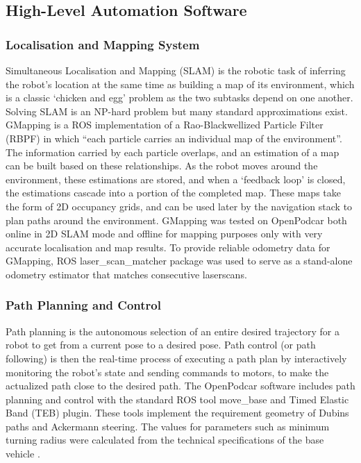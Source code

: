 \documentclass[a4paper]{article}
\begin{document}
	\subsection{High-Level Automation Software}
	
	
	\subsubsection{Localisation and Mapping System}
	
	Simultaneous Localisation and Mapping (SLAM) \cite{thrun2002probabilistic} is the robotic task of inferring the robot’s location at the same time as building a map of its environment, which is a classic `chicken and egg’ problem as the two subtasks depend on one another. Solving SLAM is an NP-hard problem but many standard approximations exist. GMapping \cite{yuen2017improved} is a ROS implementation of a Rao-Blackwellized Particle Filter (RBPF) in which ``each particle carries an individual map of the environment''. The information carried by each particle overlaps, and an estimation of a map can be built based on these relationships. As the robot moves around the environment, these estimations are stored, and when a ‘feedback loop’ is closed, the estimations cascade into a portion of the completed map. These maps take the form of 2D occupancy grids, and can be used later by the navigation stack to plan paths around the environment. GMapping was tested on OpenPodcar both online in 2D SLAM mode and offline for mapping purposes only with very accurate localisation and map results. To provide reliable odometry data for GMapping, ROS laser\_scan\_matcher package was used to serve as a stand-alone odometry estimator that matches consecutive laserscans.
	
	
	\subsubsection{Path Planning and Control}
	
	Path planning is the autonomous selection of an entire desired trajectory for a robot to get from a current pose to a desired pose. Path control (or path following) is then the real-time process of executing a path plan by interactively monitoring the robot’s state and sending commands to motors, to make the actualized path close to the desired path. The OpenPodcar software includes path planning and control with the standard ROS tool move\_base and Timed Elastic Band (TEB) \cite{rosmann2013efficient} plugin. These tools implement the requirement geometry of Dubins paths \cite{dubins1957curves} and Ackermann steering. The values for parameters such as minimum turning radius were calculated from the technical specifications of the base vehicle \cite{shoprider2016shoprider}.
	
\end{document}
